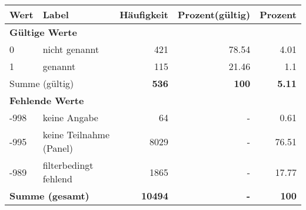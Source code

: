      \begin{longtable}{lXrrr}
     \toprule
     \textbf{Wert} & \textbf{Label} & \textbf{Häufigkeit} & \textbf{Prozent(gültig)} & \textbf{Prozent} \\
     \endhead
     \midrule
     \multicolumn{5}{l}{\textbf{Gültige Werte}}\\

     0 &
     \multicolumn{1}{X}{ nicht genannt   } &


       \num{421} &
       \num[round-mode=places,round-precision=2]{78,54} &
         \num[round-mode=places,round-precision=2]{4,01} \\

     1 &
     \multicolumn{1}{X}{ genannt   } &


       \num{115} &
       \num[round-mode=places,round-precision=2]{21,46} &
         \num[round-mode=places,round-precision=2]{1,1} \\
     \midrule
     \multicolumn{2}{l}{Summe (gültig)} &
       \textbf{\num{536}} &
     \textbf{100} &
       \textbf{\num[round-mode=places,round-precision=2]{5,11}} \\
     \multicolumn{5}{l}{\textbf{Fehlende Werte}}\\
       -998 &
       keine Angabe &
         \num{64} &
        - &
         \num[round-mode=places,round-precision=2]{0,61} \\
       -995 &
       keine Teilnahme (Panel) &
         \num{8029} &
        - &
         \num[round-mode=places,round-precision=2]{76,51} \\
       -989 &
       filterbedingt fehlend &
         \num{1865} &
        - &
         \num[round-mode=places,round-precision=2]{17,77} \\
     \midrule
     \multicolumn{2}{l}{\textbf{Summe (gesamt)}} &
          \textbf{\num{10494}} &
        \textbf{-} &
        \textbf{100} \\
     \bottomrule
     \end{longtable}
     

